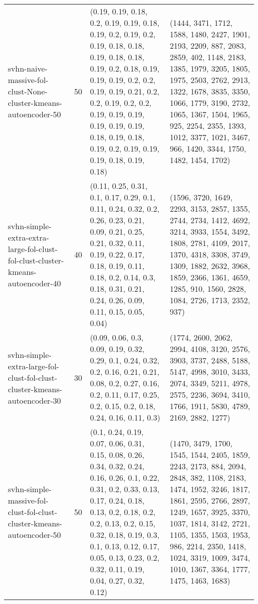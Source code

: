 \begin{longtable}{llll}
                                              svhn-naive-massive-fol-clust-None-cluster-kmeans-autoencoder-50 &             50 &         (0.19, 0.19, 0.18, 0.2, 0.19, 0.19, 0.18, 0.19, 0.2, 0.19, 0.2, 0.19, 0.18, 0.18, 0.19, 0.18, 0.18, 0.19, 0.2, 0.18, 0.19, 0.19, 0.19, 0.2, 0.2, 0.19, 0.19, 0.21, 0.2, 0.2, 0.19, 0.2, 0.2, 0.19, 0.19, 0.19, 0.19, 0.19, 0.19, 0.18, 0.19, 0.18, 0.19, 0.2, 0.19, 0.19, 0.19, 0.18, 0.19, 0.18) &  (1444, 3471, 1712, 1588, 1480, 2427, 1901, 2193, 2209, 887, 2083, 2859, 402, 1148, 2183, 1385, 1979, 3205, 1805, 1975, 2503, 2762, 2913, 1322, 1678, 3835, 3350, 1066, 1779, 3190, 2732, 1065, 1367, 1504, 1965, 925, 2254, 2355, 1393, 1012, 3377, 1021, 3467, 966, 1420, 3344, 1750, 1482, 1454, 1702) \\
                              svhn-simple-extra-extra-large-fol-clust-fol-clust-cluster-kmeans-autoencoder-40 &             40 &                                                               (0.11, 0.25, 0.31, 0.1, 0.17, 0.29, 0.1, 0.11, 0.24, 0.32, 0.2, 0.26, 0.23, 0.21, 0.09, 0.21, 0.25, 0.21, 0.32, 0.11, 0.19, 0.22, 0.17, 0.18, 0.19, 0.11, 0.18, 0.2, 0.14, 0.3, 0.18, 0.31, 0.21, 0.24, 0.26, 0.09, 0.11, 0.15, 0.05, 0.04) &                                                            (1596, 3720, 1649, 2293, 3153, 2857, 1355, 2744, 2734, 1412, 4692, 3214, 3933, 1554, 3492, 1808, 2781, 4109, 2017, 1370, 4318, 3308, 3749, 1309, 1882, 2632, 3968, 1859, 2366, 1361, 4659, 1285, 910, 1560, 2828, 1084, 2726, 1713, 2352, 937) \\
                                    svhn-simple-extra-large-fol-clust-fol-clust-cluster-kmeans-autoencoder-30 &             30 &                                                                                                                              (0.09, 0.06, 0.3, 0.09, 0.19, 0.32, 0.29, 0.1, 0.24, 0.32, 0.2, 0.16, 0.21, 0.21, 0.08, 0.2, 0.27, 0.16, 0.2, 0.11, 0.17, 0.25, 0.2, 0.15, 0.2, 0.18, 0.24, 0.16, 0.11, 0.3) &                                                                                                                      (1774, 2600, 2062, 2994, 4108, 3120, 2576, 3903, 3737, 2488, 5188, 5147, 4998, 3010, 3433, 2074, 3349, 5211, 4978, 2575, 2236, 3694, 3410, 1766, 1911, 5830, 4789, 2169, 2882, 1277) \\
                                        svhn-simple-massive-fol-clust-fol-clust-cluster-kmeans-autoencoder-50 &             50 &        (0.1, 0.24, 0.19, 0.07, 0.06, 0.31, 0.15, 0.08, 0.26, 0.34, 0.32, 0.24, 0.16, 0.26, 0.1, 0.22, 0.31, 0.2, 0.33, 0.13, 0.17, 0.24, 0.18, 0.13, 0.2, 0.18, 0.2, 0.2, 0.13, 0.2, 0.15, 0.32, 0.18, 0.19, 0.3, 0.1, 0.13, 0.12, 0.17, 0.05, 0.13, 0.23, 0.2, 0.32, 0.11, 0.19, 0.04, 0.27, 0.32, 0.12) & (1470, 3479, 1700, 1545, 1544, 2405, 1859, 2243, 2173, 884, 2094, 2848, 382, 1108, 2183, 1474, 1952, 3246, 1817, 1861, 2595, 2766, 2897, 1249, 1657, 3925, 3370, 1037, 1814, 3142, 2721, 1105, 1355, 1503, 1953, 986, 2214, 2350, 1418, 1024, 3319, 1009, 3474, 1010, 1367, 3364, 1777, 1475, 1463, 1683) \\
\end{longtable}
